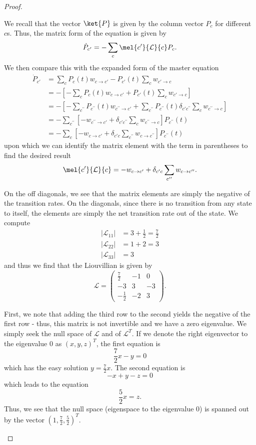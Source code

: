 \begin{proof}
	\begin{parts}
		\item We recall that the vector $\ket{P}$ is given by the column vector $P_c$ for different $c$s. Thus, the matrix form of the equation is given by
			\[
				\dot{P}_{c'} = - \sum_{c} \mel{c'}{\mathcal{L}}{c} P_{c}
			.\] 
			We then compare this with the expanded form of the master equation
			\begin{align*}
				\dot{P}_{c'} &= \sum_c P_{c}(t) w_{c \to c'} - P_{c'}(t) \sum_{c} w_{c' \to c} \\
					     &= -\left[ -\sum_c P_c(t) w_{c\to c'} + P_{c'}(t) \sum_c w_{c'\to c} \right]  \\
					     &= -\left[ -\sum_{c^{\prime\prime}} P_{c^{\prime\prime}}(t) w_{c^{\prime\prime}\to c'} + \sum_{c^{\prime\prime}}P_{c^{\prime\prime}}(t) \delta_{c' c^{\prime\prime}}\sum_c w_{c^{\prime\prime}\to c} \right]  \\
					     &= -\sum_{c^{\prime\prime}}\left[ -w_{c^{\prime\prime}\to c'} +\delta_{c' c^{\prime\prime}}\sum_c w_{c^{\prime\prime}\to c} \right]P_{c^{\prime\prime}}(t)  \\
					     &= -\sum_{c}\left[ -w_{c\to c'} +\delta_{c' c}\sum_{c^{\prime\prime}} w_{c\to c^{\prime\prime}} \right]P_{c^{\prime\prime}}(t)  
			\end{align*}
			upon which we can identify the matrix element with the term in parentheses to find the desired result
\[
	\mel{c'}{\mathcal{L}}{c} =  -w_{c\to c'} +\delta_{c' c}\sum_{c^{\prime\prime}} w_{c\to c^{\prime\prime}} 
.\] 
\item On the off diagonals, we see that the matrix elements are simply the negative of the transition rates. On the diagonals, since there is no transition from any state to itself, the elements are simply the net transition rate out of the state. We compute
	\begin{align*}
		|\mathcal{L}_{11}| &= 3 + \frac{1}{2}= \frac{7}{2} \\
		|\mathcal{L}_{22}| &= 1 + 2 = 3 \\
		|\mathcal{L}_{33}| &= 3 
	\end{align*}
	and thus we find that the Liouvillian is given by
	\[
		\mathcal{L}=\begin{pmatrix} \frac{7}{2} & -1 & 0 \\
		-3 & 3 & -3 \\
	-\frac{1}{2} & -2 & 3\end{pmatrix} 
	.\] 
\item First, we note that adding the third row to the second yields the negative of the first row - thus, this matrix is not invertible and we have a zero eigenvalue. We simply seek the null space of $\mathcal{L}$ and of $\mathcal{L}^T$. If we denote the right eigenvector to the eigenvalue 0 as $(x,y,z)^T$, the first equation is
	\[
	\frac{7}{2}x - y = 0
\]
which has the easy solution $y = \frac{7}{2}x$. The second equation is
\[
-x + y - z = 0
\] 
which leads to the equation
\[
\frac{5}{2}x = z
.\] 
Thus, we see that the null space (eigenspace to the eigenvalue 0) is spanned out by the vector $(1, \frac{7}{2}, \frac{5}{2})^T$. 


\end{parts}
\end{proof}
